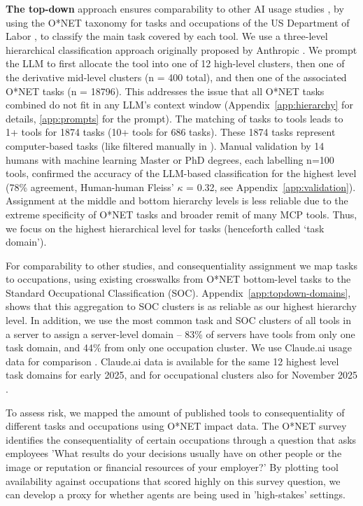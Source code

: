 \documentclass[manuscript,screen,nonacm,oneside]{acmart}
\begin{document}
\textbf{The top-down} approach ensures comparability to other AI usage studies \citep{gmyrek2023generative,brynjolfsson2018can,handa2025which,openaiChatGPTRelease}, by using the O*NET taxonomy for tasks and occupations of the US Department of Labor \citep{onetonlineONETOnLine}, to classify the main task covered by each tool. We use a three-level hierarchical classification approach originally proposed by Anthropic \citep[see Appendix][]{handa2025which}. We prompt the LLM to first allocate the tool into one of 12 high-level clusters, then one of the derivative mid-level clusters (n = 400 total), and then one of the associated O*NET tasks (n = 18796). This addresses the issue that all O*NET tasks combined do not fit in any LLM's context window (Appendix~\ref{app:hierarchy} for details, \ref{app:prompts} for the prompt). The matching of tasks to tools leads to 1+ tools for 1874 tasks (10+ tools for 686 tasks). These 1874 tasks represent computer-based tasks (like filtered manually in \citep{shao2025future}). Manual validation by 14 humans with machine learning Master or PhD degrees, each labelling n=100 tools, confirmed the accuracy of the LLM-based classification for the highest level (78\% agreement, Human-human Fleiss' $\kappa$ = 0.32, see Appendix~\ref{app:validation}). Assignment at the middle and bottom hierarchy levels is less reliable due to the extreme specificity of O*NET tasks and broader remit of many MCP tools. Thus, we focus on the highest hierarchical level for tasks (henceforth called `task domain').

For comparability to other studies, and consequentiality assignment we map tasks to occupations, using existing crosswalks from O*NET bottom-level tasks to the Standard Occupational Classification (SOC). Appendix~\ref{app:topdown-domains}, shows that this aggregation to SOC clusters is as reliable as our highest hierarchy level. In addition, we use the most common task and SOC clusters of all tools in a server to assign a server-level domain -- 83\% of servers have tools from only one task domain, and 44\% from only one occupation cluster. We use Claude.ai usage data for comparison \citep{handa2025which}. Claude.ai data is available for the same 12 highest level task domains for early 2025, and for occupational clusters also for November 2025 \citep{anthropic2026aeiv4}.

To assess risk, we mapped the amount of published tools to consequentiality of different tasks and occupations using O*NET impact data. The O*NET survey \citep{onetonlineWorkContext} identifies the consequentiality of certain occupations through a question that asks employees 'What results do your decisions usually have on other people or the image or reputation or financial resources of your employer?' By plotting tool availability against occupations that scored highly on this survey question, we can develop a proxy for whether agents are being used in 'high-stakes' settings.
\end{document}
